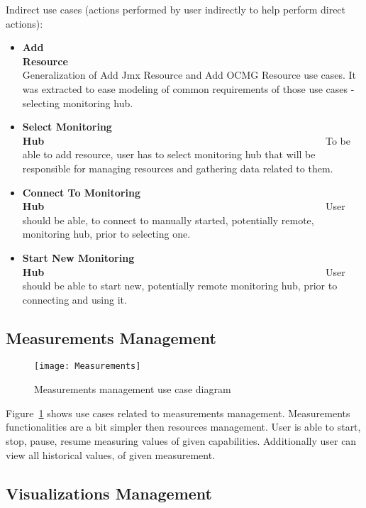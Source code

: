 Indirect use cases (actions performed by user indirectly to help perform direct actions):

\begin{itemize}
 \item {\bf Add Resource}~~~~~~~~~~~~~~~~~~~~~~~~~~~~~~~~~~~~~~~~~~~~~~~~~~~~~~~~\linebreak
Generalization of Add Jmx Resource and Add OCMG Resource use cases. It was extracted to ease modeling of common
requirements of those use cases - selecting monitoring hub.
 \item {\bf Select Monitoring Hub}~~~~~~~~~~~~~~~~~~~~~~~~~~~~~~~~~~~~~~~~~~~~~~~~~~~~~~~~\linebreak
To be able to add resource, user has to select monitoring hub that will be responsible for managing resources
and gathering data related to them.
 \item {\bf Connect To Monitoring Hub}~~~~~~~~~~~~~~~~~~~~~~~~~~~~~~~~~~~~~~~~~~~~~~~~~~~~~~~~\linebreak
User should be able, to connect to manually started, potentially remote, monitoring hub, prior to selecting one.
 \item {\bf Start New Monitoring Hub}~~~~~~~~~~~~~~~~~~~~~~~~~~~~~~~~~~~~~~~~~~~~~~~~~~~~~~~~\linebreak
User should be able to start new, potentially remote monitoring hub, prior to connecting and using it.
\end{itemize}

\subsection{Measurements Management}
\label{subsec:measurement_mgmnt}


\begin{figure}[ht]
   \centering
   \texttt{[image: Measurements]}
   \caption{Measurements management use case diagram}
   \label{fig:usecases_measurements}
 \end{figure}

Figure~\ref{fig:usecases_measurements} shows use cases related to measurements management. Measurements functionalities
are a bit simpler then resources management. User is able to start, stop, pause, resume measuring values of given
capabilities. Additionally user can view all historical values, of given measurement.

\subsection{Visualizations Management}
\label{subsec:visualizations_mgmnt}

